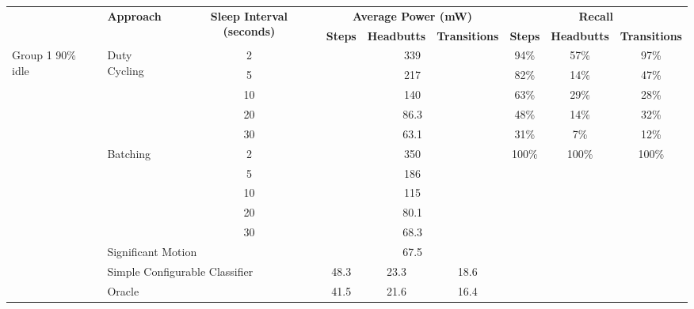 \bgroup
\def\arraystretch{1.5}
\begin{table*}
\centering
{\small
    \begin{tabular}{|l|l|c|c|c|c|c|c|c|}
    \hline
	\multirow{2}{*}{~}			& \multirow{2}{*}{\bf Approach}	& \multirow{2}{*}{\parbox{2.1cm}{\bf Sleep Interval (seconds)}}	
																						& \multicolumn{3}{c|}{\bf Average Power (mW)}		& \multicolumn{3}{c|}{\bf Recall} 													\\ \cline{4-9}
								&								&						& {\bf Steps}	& {\bf Headbutts}	& {\bf Transitions}	& {\bf Steps}	& {\bf Headbutts}	& {\bf Transitions} 				\\ \hline
	\multirow{14}{*}{\parbox{1.2cm}{Group 1 90\% idle}}	
								& \multirow{5}{*}{Duty Cycling}	& 2						& \multicolumn{3}{c|}{339}				& 94\%					& 57\%						& 97\%						\\ \cline{3-9}
								& 								& 5						& \multicolumn{3}{c|}{217}				& 82\%					& 14\%						& 47\%						\\ \cline{3-9}
								& 								& 10					& \multicolumn{3}{c|}{140}				& 63\%					& 29\%						& 28\%						\\ \cline{3-9}
								& 								& 20					& \multicolumn{3}{c|}{86.3}				& 48\%					& 14\%						& 32\%						\\ \cline{3-9}
								& 								& 30					& \multicolumn{3}{c|}{63.1}				& 31\%					& 7\%						& 12\%						\\ \cline{2-9}
								
								& \multirow{5}{*}{Batching}		& 2						& \multicolumn{3}{c|}{350}				& \multirow{8}{*}{100\%}& \multirow{8}{*}{100\%}	& \multirow{8}{*}{100\%}	\\ \cline{3-6}
								& 								& 5						& \multicolumn{3}{c|}{186}				&						&							&							\\ \cline{3-6}
								& 								& 10					& \multicolumn{3}{c|}{115}				&						&							&							\\ \cline{3-6}
								& 								& 20					& \multicolumn{3}{c|}{80.1}				&						&							&							\\ \cline{3-6}
								& 								& 30					& \multicolumn{3}{c|}{68.3}				&						&							&							\\ \cline{2-6}
								
								& \multicolumn{2}{l|}{Significant Motion}				& \multicolumn{3}{c|}{67.5}				& 						& 							& 							\\ \cline{2-6}
								& \multicolumn{2}{l|}{Simple Configurable Classifier}	& 48.3		& 23.3		& 18.6			& 						& 							& 							\\ \cline{2-6}
								& \multicolumn{2}{l|}{Oracle}							& 41.5		& 21.6		& 16.4			& 						& 							& 							\\ \hline \hline
								

\end{tabular}}
\end{table*}
